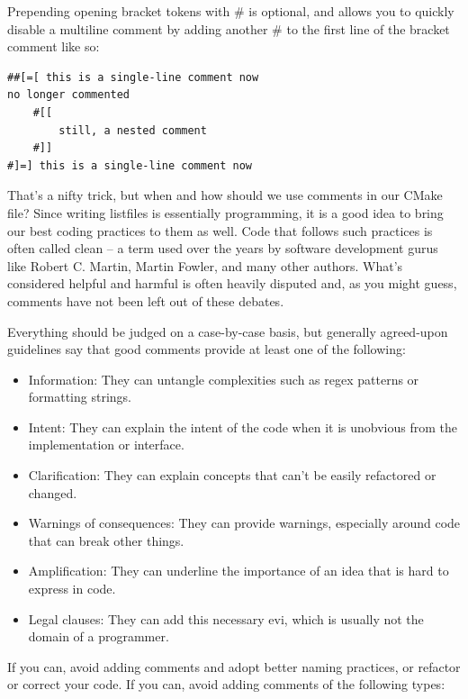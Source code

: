 Prepending opening bracket tokens with \# is optional, and allows you to quickly disable a multiline comment by adding another \# to the first line of the bracket comment like so:

\begin{lstlisting}[style=styleCMake]	
##[=[ this is a single-line comment now
no longer commented
	#[[
		still, a nested comment
	#]]
#]=] this is a single-line comment now
\end{lstlisting}

That's a nifty trick, but when and how should we use comments in our CMake file? Since writing listfiles is essentially programming, it is a good idea to bring our best coding practices to them as well. Code that follows such practices is often called clean – a term used over the years by software development gurus like Robert C. Martin, Martin Fowler, and many other authors. What's considered helpful and harmful is often heavily disputed and, as you might guess, comments have not been left out of these debates.

Everything should be judged on a case-by-case basis, but generally agreed-upon guidelines say that good comments provide at least one of the following:

\begin{itemize}
\item 
Information: They can untangle complexities such as regex patterns or formatting strings.

\item 
Intent: They can explain the intent of the code when it is unobvious from the implementation or interface.

\item 
Clarification: They can explain concepts that can't be easily refactored or changed.

\item 
Warnings of consequences: They can provide warnings, especially around code that can break other things.

\item 
Amplification: They can underline the importance of an idea that is hard to express in code.

\item 
Legal clauses: They can add this necessary evi, which is usually not the domain of a programmer.
\end{itemize}

If you can, avoid adding comments and adopt better naming practices, or refactor or correct your code. If you can, avoid adding comments of the following types:

